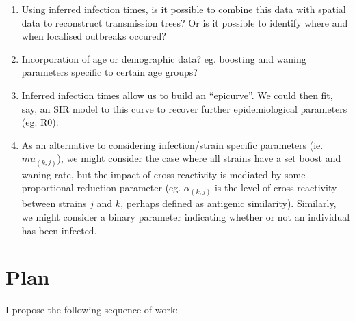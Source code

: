 \documentclass[a4paper,11pt,twoside]{article}
\begin{document}
\begin{enumerate}
\item Using inferred infection times, is it possible to combine this data with spatial data to reconstruct transmission trees? Or is it possible to identify where and when localised outbreaks occured?
\item Incorporation of age or demographic data? eg. boosting and waning parameters specific to certain age groups?
\item Inferred infection times allow us to build an ``epicurve''. We could then fit, say, an SIR model to this curve to recover further epidemiological parameters (eg. R0).
\item As an alternative to considering infection/strain specific parameters (ie. $mu_{(k,j)}$), we might consider the case where all strains have a set boost and waning rate, but the impact of cross-reactivity is mediated by some proportional reduction parameter (eg. $\alpha_{(k,j)}$ is the level of cross-reactivity between strains $j$ and $k$, perhaps defined as antigenic similarity). Similarly, we might consider a binary parameter indicating whether or not an individual has been infected.
\end{enumerate}

\section{Plan}
I propose the following sequence of work:
\end{document}
